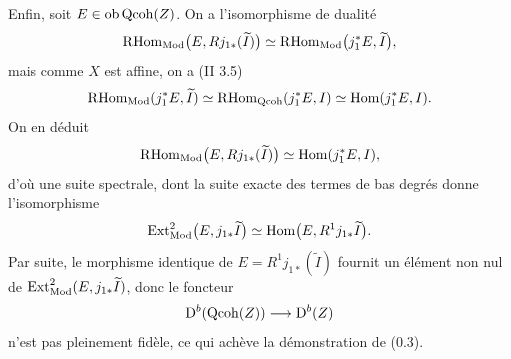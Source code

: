 \documentclass[11pt]{article}
\begin{document}
Enfin, soit $E\in\operatorname{ob}\operatorname{Qcoh}(Z)$. On a l'isomorphisme de dualité
\[
\mathrm R\!\operatorname{Hom}_{\operatorname{Mod}}\bigl(E,Rj_{1*}(\widetilde I)\bigr)
\simeq
\mathrm R\!\operatorname{Hom}_{\operatorname{Mod}}\bigl(j_1^*E,\widetilde I\bigr),
\]
mais comme $X$ est affine, on a (II 3.5)
\[
\mathrm R\!\operatorname{Hom}_{\operatorname{Mod}}(j_1^*E,\widetilde I)
\simeq
\mathrm R\!\operatorname{Hom}_{\operatorname{Qcoh}}(j_1^*E,I)
\simeq
\operatorname{Hom}(j_1^*E,I).
\]
On en déduit
\[
\mathrm R\!\operatorname{Hom}_{\operatorname{Mod}}\bigl(E,Rj_{1*}(\widetilde I)\bigr)
\simeq
\operatorname{Hom}(j_1^*E,I),
\]
d'où une suite spectrale, dont la suite exacte des termes de bas degrés donne l'isomorphisme
\[
\operatorname{Ext}^2_{\operatorname{Mod}}\bigl(E,j_{1*}\widetilde I\bigr)
\simeq
\operatorname{Hom}\bigl(E,R^1j_{1*}\widetilde I\bigr).
\]
Par suite, le morphisme identique de $E=R^1j_{1*}(\widetilde I)$ fournit un élément non nul de $\operatorname{Ext}^2_{\operatorname{Mod}}(E,j_{1*}\widetilde I)$, donc le foncteur
\[
\mathrm D^b(\operatorname{Qcoh}(Z))\longrightarrow\mathrm D^b(Z)
\]
n'est pas pleinement fidèle, ce qui achève la démonstration de (0.3).
\end{document}

